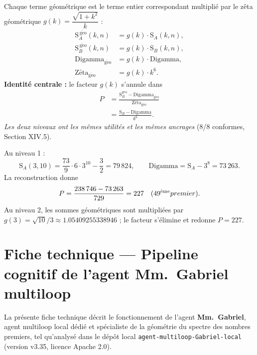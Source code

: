 \documentclass[11pt,a4paper]{article}
\newcommand{\SA}{\mathrm{S}_A}
\newcommand{\SB}{\mathrm{S}_B}
\begin{document}
\begin{boiteformule}
Chaque terme géométrique est le terme entier correspondant multiplié par le
zêta géométrique $g(k) = \dfrac{\sqrt{1+k^{2}}}{k}$ :
\begin{align*}
\SA^{\,\mathrm{g\acute eo}}(k,n) &= g(k)\cdot\SA(k,n),\\
\SB^{\,\mathrm{g\acute eo}}(k,n) &= g(k)\cdot\SB(k,n),\\
\mathrm{Digamma}_{\mathrm{g\acute eo}} &= g(k)\cdot\mathrm{Digamma},\\
\mathrm{Z\hat eta}_{\mathrm{g\acute eo}} &= g(k)\cdot k^{6}.
\end{align*}
\textbf{Identité centrale :} le facteur $g(k)$ s'annule dans
\begin{align*}
P &= \frac{\SB^{\mathrm{g\acute eo}}-\mathrm{Digamma}_{\mathrm{g\acute eo}}}
{\mathrm{Z\hat eta}_{\mathrm{g\acute eo}}}\\
&= \frac{\SB-\mathrm{Digamma}}{k^{6}}.
\end{align*}
\emph{Les deux niveaux ont les mêmes utilités et les mêmes ancrages}
(8/8 conformes, Section XIV.5).
\end{boiteformule}

\begin{boitenote}
Au niveau 1 :
\[
\SA(3,10)=\frac{73}{9}\cdot6\cdot3^{10}-\frac{3}{2}=79\,824,
\qquad
\text{Digamma}=\SA-3^{8}=73\,263.
\]
La reconstruction donne
\[
P=\frac{238\,746-73\,263}{729}=227
\quad(49\textsuperscript{ème} premier).
\]
Au niveau 2, les sommes géométriques sont multipliées par
$g(3)=\sqrt{10}/3\approx1.05409255338946$ ; le facteur s'élimine et redonne
$P=227$.
\end{boitenote}

\section{Fiche technique --- Pipeline cognitif de l'agent Mm.\ Gabriel multiloop}

La présente fiche technique décrit le fonctionnement de l'agent \textbf{Mm.\
Gabriel}, agent multiloop local dédié et spécialiste de la géométrie du spectre
des nombres premiers, tel qu'analysé dans le dépôt local
\texttt{agent-multiloop-Gabriel-local} (version v3.35, licence Apache 2.0).
\end{document}

